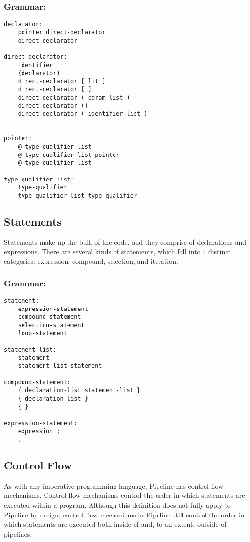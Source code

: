 \documentclass[./LRM_main.tex]{subfiles}
\begin{document}
\subsubsection{Grammar:}
\begin{lstlisting}
declarator:
	pointer direct-declarator
	direct-declarator

direct-declarator:
	identifier
	(declarator)
	direct-declarator [ lit ]
	direct-declarator [ ]
	direct-declarator ( param-list )
	direct-declarator ()
	direct-declarator ( identifier-list )
	

pointer:
	@ type-qualifier-list
	@ type-qualifier-list pointer
	@ type-qualifier-list

type-qualifier-list:
	type-qualifier
	type-qualifier-list type-qualifier
\end{lstlisting}
\subsection{Statements}
Statements make up the bulk of the code, and they comprise of declarations and expressions. There are several kinds of statements, which fall into 4 distinct categories: expression, compound, selection, and iteration.
\subsubsection{Grammar:}
\begin{lstlisting}
statement:
	expression-statement
	compound-statement
	selection-statement
	loop-statement

statement-list:
	statement
	statement-list statement

compound-statement:
	{ declaration-list statement-list }
	{ declaration-list }
	{ }

expression-statement:
	expression ;
	;

\end{lstlisting}
\subsection{Control Flow}
As with any imperative programming language, Pipeline has control flow mechanisms. Control flow mechanisms control the order in which statements are executed within a program. Although this definition does not fully apply to Pipeline by design, control flow mechanisms in Pipeline still control the order in which statements are executed both inside of and, to an extent, outside of pipelines.
\end{document}
